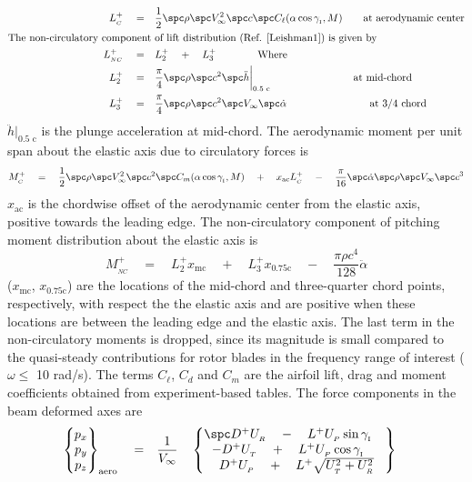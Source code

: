 \begin{align*}
L_{_C}^+ \quad = \quad &\frac{1}{2} \spc \rho \spc V_\infty^2 \spc c \spc C_{\ell}(\alpha \cos \gamma_{_\textrm{I}},M) \qquad \textrm{at aerodynamic center} \\
\textrm{The non-circulatory component } & \textrm{of lift distribution (Ref. \cite{Leishman1}) is given by} \\
L_{_{NC}}^+ \quad = \quad & L_2^+ \quad + \quad L_3^+ \qquad \qquad \textrm{Where} \\
L_2^+ \quad = \quad &\frac{\pi}{4} \spc \rho \spc c^2 \spc \ddot{h}\biggr\rvert_\textrm{0.5 c} \quad \qquad \qquad \qquad \quad \textrm{at mid-chord} \\
L_3^+ \quad = \quad & \frac{\pi}{4} \spc \rho \spc c^2 \spc V_\infty \spc \dot{\alpha} \qquad \qquad \qquad \qquad \textrm{at 3/4 chord} 
\end{align*}
$\ddot{h}\biggr\rvert_\textrm{0.5 c}$ is the plunge acceleration at mid-chord. The aerodynamic moment per unit span about the elastic axis due to circulatory forces is
\[M_{_C}^+ \quad = \quad \frac{1}{2} \spc  \rho \spc V_\infty^2 \spc c^2 \spc C_m(\alpha \cos \gamma_{_\textrm{I}},M) \quad + \quad x_{\textrm{ac}} L_{_C}^+ \quad - \quad \frac{\pi}{16} \spc \dot{\alpha} \spc \rho \spc V_\infty \spc c^3 \]
$x_\textrm{ac}$ is the chordwise offset of the aerodynamic center from the elastic axis, positive towards the leading edge. The non-circulatory component of pitching moment distribution about the elastic axis is
\begin{equation}
M_{_{NC}}^+ \quad = \quad L_2^+ x_{\textrm{mc}} \quad + \quad L_3^+ x_{\textrm{0.75c}} \quad - \quad \frac{\pi \rho c^4}{128} \ddot{\alpha}
\end{equation}
($x_{\textrm{mc}}$, $x_{\textrm{0.75c}}$) are the locations of the mid-chord and three-quarter chord points, respectively, with respect the the elastic axis and are positive when these locations are between the leading edge and the elastic axis. The last term in the non-circulatory moments is dropped, since its magnitude is small compared to the quasi-steady contributions for rotor blades in the frequency range of interest ($\omega \leq$ 10 rad/s). The terms $C_\ell$, $C_d$ and $C_m$ are the airfoil lift, drag and moment coefficients obtained from experiment-based tables. The force components in the beam deformed axes are 
\begin{equation}
\begin{aligned}
\begin{Bmatrix} p_x \\ p_y \\ p_z \end{Bmatrix}_{\textrm{aero}} \quad = \quad & \frac{1}{V_\infty} \quad \begin{Bmatrix} \spc  D^+ U_{_R} \quad - \quad L^+ U_{_P} \sin \gamma_{_\textrm{I}} \quad \\  -D^+ U_{_T} \quad + \quad L^+ U_{_P} \cos \gamma_{_\textrm{I}} \quad \\ \textrm{  } D^+ U_{_P} \quad + \quad L^+ \sqrt{U_{_T}^2 + U_{_R}^2} \end{Bmatrix}
\end{aligned}
\end{equation}
